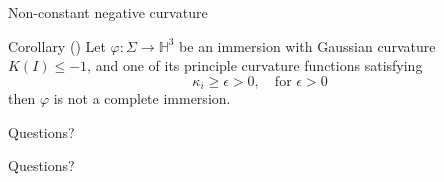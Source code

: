 \begin{frame}[c]{Non-constant negative curvature}
	\begin{kulblock}{Corollary (\cite{GALVEZ20151058})}
		Let $\varphi: \Sigma \to \mathbb{H}^3$ be an immersion with Gaussian curvature $K(I) \leq -1$, and one of its principle curvature functions satisfying
		$$\kappa_i \geq \epsilon > 0, \quad \text{for } \epsilon>0 $$
		then $\varphi$ is not a complete immersion.
	\end{kulblock}
\end{frame}

\begin{frame}[c]{Questions?}
	\begin{center}
		\Large{Questions?}
	\end{center}

\end{frame}